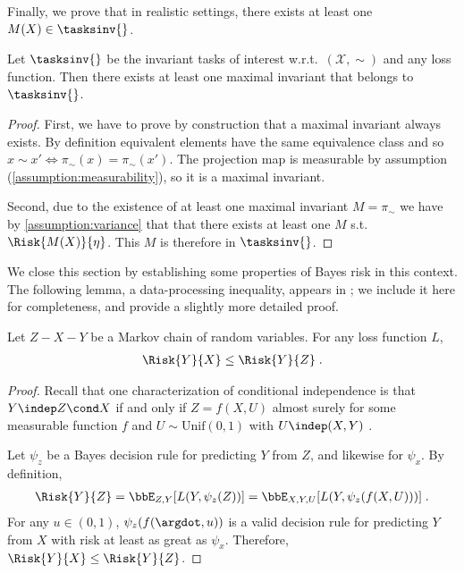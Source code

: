\documentclass[final]{article}
\begin{document}
Finally, we prove that in realistic settings, there exists at least one $M(X) \in \tasksinv{}$.
\begin{lemma}\label{lemma:one_Mx_is_task}
Let $\tasksinv{}$ be the invariant tasks of interest w.r.t.\  $(\mathcal{X},\sim)$ and any loss function.  
Then there exists at least one maximal invariant that belongs to $\tasksinv{}$.
\end{lemma}
\begin{proof}
First, we have to prove by construction that a maximal invariant always exists. 
By definition equivalent elements have the same equivalence class and so $x \sim x' \iff \pi_{\sim}(x) = \pi_{\sim}(x')$. The projection map is measurable by assumption (\cref{assumption:measurability}), so it is a maximal invariant.

Second, due to the existence of at least one maximal invariant $M =\pi_{\sim}$ we have by \cref{assumption:variance} that that there exists at least one $M$ s.t. $\Risk{M(X)}{\eta}$.
This $M$ is therefore in $\tasksinv{}$.

\end{proof}

We close this section by establishing some properties of Bayes risk in this context. The following lemma, a data-processing inequality, appears in \citet{xu_minimum_2020}; we include it here for completeness, and provide a slightly more detailed proof.

\begin{lemma} \label{lemma:dpi:bayes}
	Let $Z - X - Y$ be a Markov chain of random variables. For any loss function $L$,
	\begin{align}
		\Risk{Y}{X} \leq \Risk{Y}{Z} \;.
	\end{align}
\end{lemma}
\begin{proof}
	Recall that one characterization of conditional independence is that $Y \indep Z \cond X$ if and only if $Z = f(X,U)$ almost surely for some measurable function $f$ and $U \sim \textrm{Unif}(0,1)$ with $U \indep (X,Y)$ \citep[][Prop.\ 6.13]{kallenberg_foundations_2002}.


	Let $\psi_z$ be a Bayes decision rule for predicting $Y$ from $Z$, and likewise for $\psi_x$. By definition,
	\begin{align*}
		\Risk{Y}{Z} = \bbE_{Z,Y}[L(Y,\psi_z(Z))] = \bbE_{X,Y,U}[L(Y,\psi_z(f(X,U)))]  \;.
	\end{align*}
	For any $u \in (0,1)$, $\psi_z(f(\argdot,u))$ is a valid decision rule for predicting $Y$ from $X$ with risk at least as great as $\psi_x$. Therefore, $\Risk{Y}{X} \leq \Risk{Y}{Z}$.

\end{proof}
\end{document}
